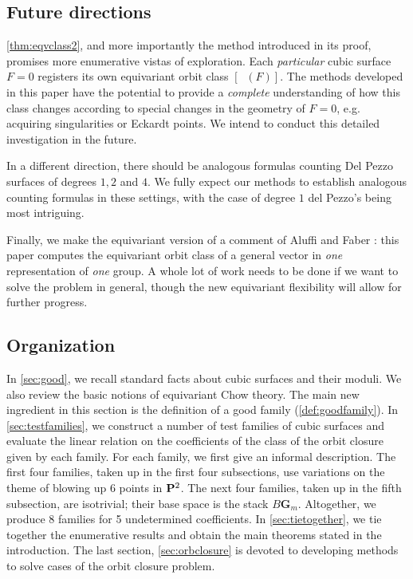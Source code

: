 \documentclass[12pt,reqno]{amsart}
\DeclareMathOperator{\Orb}{\overline{Orb}}
\numberwithin{equation}{section}
\newcommand{\G}{\mathbf G}
\begin{document}
\subsection{Future directions}

\autoref{thm:eqvclass2}, and more importantly the method introduced in
its proof, promises more enumerative vistas of exploration.  Each {\sl
  particular} cubic surface $F=0$ registers its own equivariant orbit
class $[\Orb(F)]$.  The methods developed in this paper have the
potential to provide a {\sl complete} understanding of how this class
changes according to special changes in the geometry of $F=0$,
e.g. acquiring singularities or Eckardt points. We intend to conduct
this detailed investigation in the future.

In a different direction, there should be analogous formulas counting
Del Pezzo surfaces of degrees $1,2$ and $4$.  We fully expect our
methods to establish analogous counting formulas in these settings,
with the case of degree $1$ del Pezzo's being most intriguing.

Finally, we make the equivariant version of a comment of Aluffi and
Faber \cite{alu.fab:93}: this paper computes the equivariant orbit
class of a general vector in \emph{one} representation of \emph{one}
group.  A whole lot of work needs to be done if we want to solve the
problem in general, though the new equivariant flexibility will allow
for further progress.

\subsection{Organization}
In \autoref{sec:good}, we recall standard facts about cubic surfaces
and their moduli.  We also review the basic notions of equivariant
Chow theory.  The main new ingredient in this section is the
definition of a good family (\autoref{def:goodfamily}).  In
\autoref{sec:testfamilies}, we construct a number of test families of
cubic surfaces and evaluate the linear relation on the coefficients of
the class of the orbit closure given by each family.  For each family,
we first give an informal description.  The first four families, taken
up in the first four subsections, use variations on the theme of
blowing up 6 points in $\P^2$.  The next four families, taken up in
the fifth subsection, are isotrivial; their base space is the stack
$B\G_m$.  Altogether, we produce 8 families for 5 undetermined
coefficients.  In \autoref{sec:tietogether}, we tie together the
enumerative results and obtain the main theorems stated in the
introduction.  The last section, \autoref{sec:orbclosure} is devoted
to developing methods to solve cases of the orbit closure problem.
\end{document}
